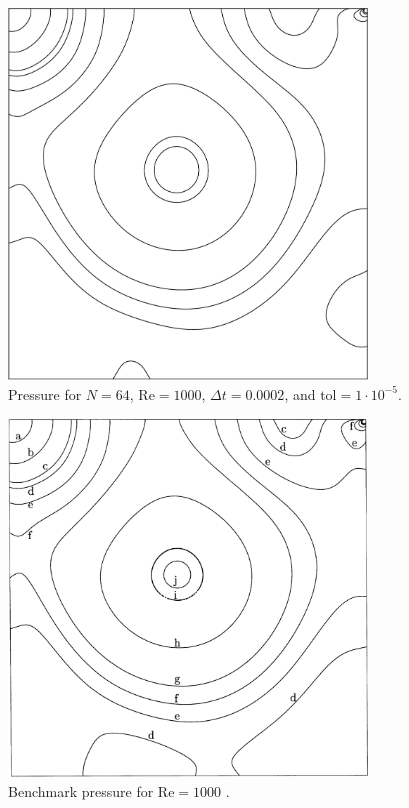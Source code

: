 \begin{figure}[p]
    \centering
    \includegraphics[width=0.85\textwidth]{Images/pressure.pdf}
    \caption{Pressure for $N = 64$, $\text{Re} = 1000$, $\Delta t = 0.0002$, and $\text{tol} = 1 \cdot 10^{-5}$.}
    \label{fig:PN64}
\end{figure}

\begin{figure}[p]
    \centering
    \includegraphics[width=0.85\textwidth]{Images/pressure.png}
    \caption{Benchmark pressure for $\text{Re} = 1000$ \parencite{botella1998benchmark}.}
    \label{fig:benchmarkPN64}
\end{figure}
